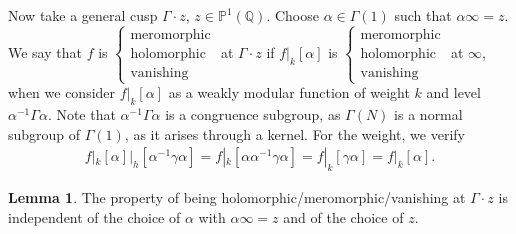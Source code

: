\documentclass{article}
\theoremstyle{definition}
\newtheorem{lemma}[theorem]{Lemma}
\begin{document}
Now take a general cusp $\Gamma \cdot z$, $z \in \mathbb{P}^1(\mathbb{Q})$. Choose $\alpha \in \Gamma(1)$ such that $\alpha \infty = z$. We say that $f$ is $\begin{cases}
    \text{meromorphic}\\
    \text{holomorphic}\\
    \text{vanishing}
\end{cases}$ at $\Gamma \cdot z$ if $f|_k[\alpha]$ is $\begin{cases}
    \text{meromorphic}\\
    \text{holomorphic}\\
    \text{vanishing}
\end{cases}$ at $\infty$, when we consider $f|_k[\alpha]$ as a weakly modular function of weight $k$ and level $\alpha^{-1}\Gamma \alpha$. Note that $\alpha^{-1} \Gamma \alpha$ is a congruence subgroup, as $\Gamma(N)$ is a normal subgroup of $\Gamma(1)$, as it arises through a kernel. For the weight, we verify 
\begin{align*}
    f|_k[\alpha]|_h[\alpha^{-1} \gamma \alpha] = f|_k[\alpha \alpha^{-1} \gamma \alpha] = f|_k[ \gamma \alpha] = f|_k[\alpha].
\end{align*}
\begin{lemma}\label{lemma5.3}
    The property of being holomorphic/meromorphic/vanishing at $\Gamma \cdot z$ is independent of the choice of $\alpha$ with $\alpha \infty = z$ and of the choice of $z$.
\end{lemma}
\end{document}
